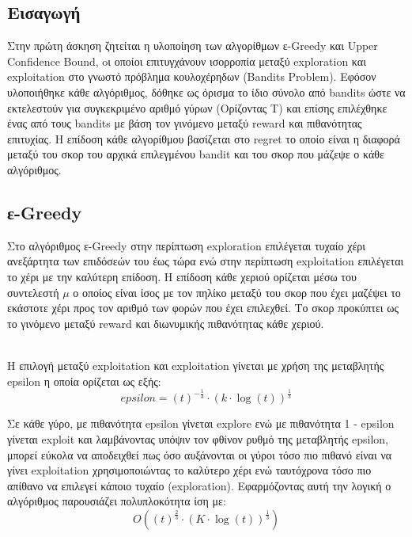 \subsection*{Εισαγωγή}
Στην πρώτη άσκηση ζητείται η υλοποίηση των αλγορίθμων ε-Greedy και Upper Confidence Bound, oι οποίοι επιτυγχάνουν ισορροπία μεταξύ exploration και exploitation στο γνωστό πρόβλημα κουλοχέρηδων (Bandits Problem). Εφόσον υλοποιήθηκε κάθε αλγόριθμος, δόθηκε ως όρισμα το ίδιο σύνολο από bandits ώστε να εκτελεστούν για συγκεκριμένο αριθμό γύρων (Ορίζοντας Τ) και επίσης επιλέχθηκε ένας από τους bandits με βάση τον γινόμενο μεταξύ reward και πιθανότητας επιτυχίας. Η επίδοση κάθε αλγορίθμου βασίζεται στο regret το οποίο είναι η διαφορά μεταξύ του σκορ του αρχικά επιλεγμένου bandit και του σκορ που μάζεψε ο κάθε αλγόριθμος.  

\subsection*{ε-Greedy}
\noindent
Στο αλγόριθμος ε-Greedy στην περίπτωση exploration επιλέγεται τυχαίο χέρι ανεξάρτητα των επιδόσεών του έως τώρα ενώ στην περίπτωση exploitation επιλέγεται το χέρι με την καλύτερη επίδοση. Η επίδοση κάθε χεριού ορίζεται μέσω του συντελεστή $\mu$ ο οποίος είναι ίσος με τον πηλίκο μεταξύ του σκορ που έχει μαζέψει το εκάστοτε χέρι προς τον αριθμό των φορών που έχει επιλεχθεί. Το σκορ προκύπτει ως το γινόμενο μεταξύ reward και διωνυμικής πιθανότητας κάθε χεριού. 

\noindent\\
Η επιλογή μεταξύ exploitation και exploitation γίνεται με χρήση της μεταβλητής epsilon η οποία ορίζεται ως εξής:
\begin{equation*}
	epsilon = (t)^{-\frac{1}{3}} \cdot (k \cdot \log(t))^{\frac{1}{3}}
\end{equation*}

\noindent
Σε κάθε γύρο, με πιθανότητα epsilon γίνεται explore ενώ με πιθανότητα 1 - epsilon γίνεται exploit και λαμβάνοντας υπόψιν τον φθίνον ρυθμό της μεταβλητής epsilon, μπορεί εύκολα να αποδειχθεί πως όσο αυξάνονται οι γύροι τόσο πιο πιθανό είναι να γίνει exploitation χρησιμοποιώντας το καλύτερο χέρι ενώ ταυτόχρονα τόσο πιο απίθανο να επιλεγεί κάποιο τυχαίο (exploration). Εφαρμόζοντας αυτή την λογική ο αλγόριθμος παρουσιάζει πολυπλοκότητα ίση με:
\begin{equation}
	O\left( (t)^{\frac{2}{3}} \cdot (K \cdot \log(t))^{\frac{1}{3}} \right)
\end{equation}




